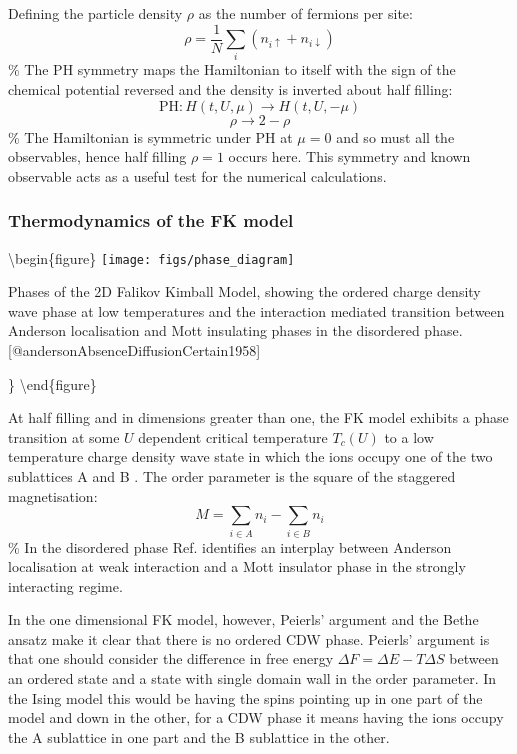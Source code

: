 Defining the particle density \(\rho\) as the number of fermions per site: \[
    \rho = \frac{1}{N} \sum_i \left( n_{i \uparrow} + n_{i \downarrow} \right)
\] \% The PH symmetry maps the Hamiltonian to itself with the sign of the chemical potential reversed and the density is inverted about half filling: \[ \text{PH} : H(t, U, \mu) \rightarrow H(t, U, -\mu) \] \[ \rho \rightarrow 2 - \rho \] \% The Hamiltonian is symmetric under PH at \(\mu = 0\) and so must all the observables, hence half filling \(\rho = 1\) occurs here. This symmetry and known observable acts as a useful test for the numerical calculations.

\hypertarget{thermodynamics-of-the-fk-model}{%
\subsubsection{Thermodynamics of the FK model}\label{thermodynamics-of-the-fk-model}}

\textbackslash begin\{figure\} \centering \texttt{[image: figs/phase\_diagram]}

\caption{Phases of the 2D Falikov Kimball Model, showing the ordered charge density wave phase at low temperatures and the interaction mediated transition between Anderson localisation and Mott insulating phases in the disordered phase. [@andersonAbsenceDiffusionCertain1958]}

\} \label{fig:FK_phase_diagram} \textbackslash end\{figure\}

At half filling and in dimensions greater than one, the FK model exhibits a phase transition at some \(U\) dependent critical temperature \(T_c(U)\) to a low temperature charge density wave state in which the ions occupy one of the two sublattices A and B \autocite{maskaThermodynamicsTwodimensionalFalicovKimball2006}. The order parameter is the square of the staggered magnetisation: \[
M = \sum_{i \in A} n_i - \sum_{i \in B} n_i
\] \% In the disordered phase Ref. \autocite{andersonAbsenceDiffusionCertain1958} identifies an interplay between Anderson localisation at weak interaction and a Mott insulator phase in the strongly interacting regime.

In the one dimensional FK model, however, Peierls' argument \autocite{peierlsIsingModelFerromagnetism1936,kennedyItinerantElectronModel1986} and the Bethe ansatz \autocite{liebAbsenceMottTransition1968} make it clear that there is no ordered CDW phase. Peierls' argument is that one should consider the difference in free energy \(\Delta F = \Delta E - T\Delta S\) between an ordered state and a state with single domain wall in the order parameter. In the Ising model this would be having the spins pointing up in one part of the model and down in the other, for a CDW phase it means having the ions occupy the A sublattice in one part and the B sublattice in the other.


